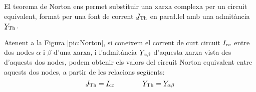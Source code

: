 El teorema de Norton ens permet substituir una xarxa complexa per un circuit equivalent, format per una font de corrent $\cmplx{J}\ped{Th}$ en para{\l.l}el amb una admit\`{a}ncia $\cmplx{Y}\ped{Th}$.

Atenent a la Figura \vref{pic:Norton}, si coneixem el corrent de curt circuit $\cmplx{I}\ped{cc}$ entre dos nodes $\alpha$ i $\beta$ d'una xarxa, i l'admit\`{a}ncia $\cmplx{Y}_{\alpha\beta}$ d'aquesta xarxa vista des d'aquests dos nodes, podem obtenir els valors del circuit Norton equivalent entre aquests dos nodes, a partir de les relacions seg\"{u}ents:
\begin{equation}
   \cmplx{J}\ped{Th} = \cmplx{I}\ped{cc} \qquad\qquad \cmplx{Y}\ped{Th} = \cmplx{Y}_{\alpha\beta}
\end{equation}

